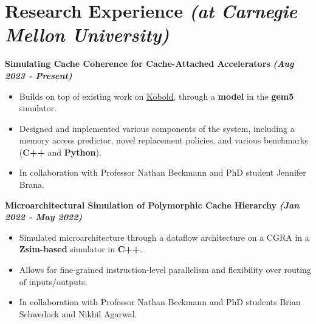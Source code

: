 \documentclass[10pt]{article}
\begin{document}
  \vspace*{-1.2cm}
    \section*{{\Large \textcolor{lighterB}{Research Experience}} {\normalsize \textit{\textcolor{lighterB}{(at Carnegie Mellon University)}}}}
  \vspace*{-0.23cm}

  \textbf{\large Simulating Cache Coherence for Cache-Attached Accelerators} {\hfill \textit{\textbf{(Aug 2023 - Present)}}}
  \vspace*{-0.17cm}
  \begin{itemize}
    \itemsep0em
    \item \textcolor{lighterG}{Builds on top of existing work on \href{https://ieeexplore.ieee.org/document/10106564}{\underline{Kobold}}, through a \textbf{model} in the \textbf{gem5} simulator.}
    \item \textcolor{lighterG}{Designed and implemented various components of the system, including a memory access predictor, novel replacement policies, and various benchmarks (\textbf{C++} and \textbf{Python}).}
    \item \textcolor{lighterG}{In collaboration with Professor Nathan Beckmann and PhD student Jennifer Brana.}
  \end{itemize}

  \textbf{\large Microarchitectural Simulation of Polymorphic Cache Hierarchy} {\hfill \textit{\textbf{(Jan 2022 - May 2022)}}}
  \vspace*{-0.17cm}
  \begin{itemize}
    \itemsep0em
    \item \textcolor{lighterG}{Simulated microarchitecture through a dataflow architecture on a CGRA in a \textbf{Zsim-based} simulator in \textbf{C++}.}
    \item \textcolor{lighterG}{Allows for fine-grained instruction-level parallelism and flexibility over routing of inputs/outputs.}
    \item \textcolor{lighterG}{In collaboration with Professor Nathan Beckmann and PhD students Brian Schwedock and Nikhil Agarwal.}
  \end{itemize}
\end{document}
